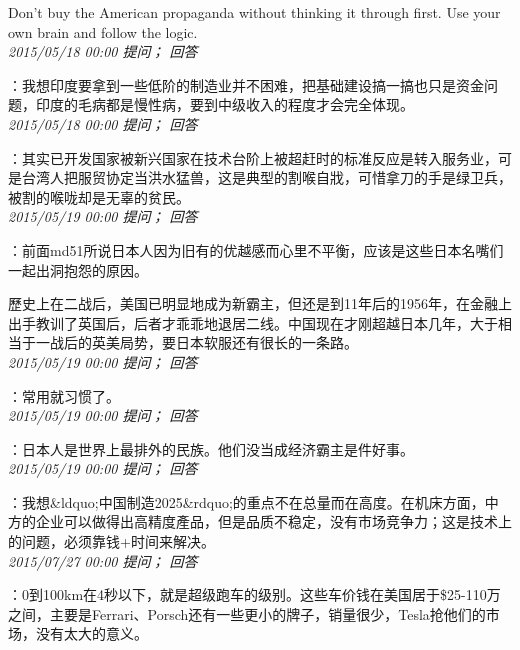\documentclass[twocolumn]{ctexart}
\begin{document}
Don't buy the American propaganda without thinking it through first. Use your own brain and follow the logic.\\

\textit{\hfill\noindent\small 2015/05/18 00:00 提问； 回答}

：我想印度要拿到一些低阶的制造业并不困难，把基础建设搞一搞也只是资金问题，印度的毛病都是慢性病，要到中级收入的程度才会完全体现。\\

\textit{\hfill\noindent\small 2015/05/18 00:00 提问； 回答}

：其实已开发国家被新兴国家在技术台阶上被超赶时的标准反应是转入服务业，可是台湾人把服贸协定当洪水猛兽，这是典型的割喉自戕，可惜拿刀的手是绿卫兵，被割的喉咙却是无辜的贫民。\\

\textit{\hfill\noindent\small 2015/05/19 00:00 提问； 回答}

：前面md51所说日本人因为旧有的优越感而心里不平衡，应该是这些日本名嘴们一起出洞抱怨的原因。

歷史上在二战后，美国已明显地成为新霸主，但还是到11年后的1956年，在金融上出手教训了英国后，后者才乖乖地退居二线。中国现在才刚超越日本几年，大于相当于一战后的英美局势，要日本软服还有很长的一条路。\\

\textit{\hfill\noindent\small 2015/05/19 00:00 提问； 回答}

：常用就习惯了。\\

\textit{\hfill\noindent\small 2015/05/19 00:00 提问； 回答}

：日本人是世界上最排外的民族。他们没当成经济霸主是件好事。\\

\textit{\hfill\noindent\small 2015/05/19 00:00 提问； 回答}

：我想\&ldquo;中国制造2025\&rdquo;的重点不在总量而在高度。在机床方面，中方的企业可以做得出高精度產品，但是品质不稳定，没有市场竞争力；这是技术上的问题，必须靠钱+时间来解决。\\

\textit{\hfill\noindent\small 2015/07/27 00:00 提问； 回答}

：0到100km在4秒以下，就是超级跑车的级别。这些车价钱在美国居于\$25-110万之间，主要是Ferrari、Porsch还有一些更小的牌子，销量很少，Tesla抢他们的市场，没有太大的意义。
\end{document}
